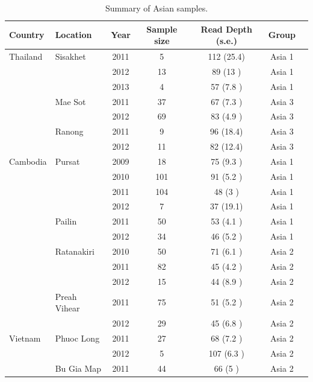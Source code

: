 \documentclass[9pt,lineno]{elife}
\begin{document}
\begin{table}[bt]
\caption{Summary of Asian samples.} \label{tab:Pf3kAsia}
\begin{tabular}{l l c c c c c}
\toprule
Country & Location & Year & Sample size & Read Depth (s.e.) & Group \\
\midrule
Thailand        &Sisakhet       &2011 &5    &112  (25.4)&Asia 1  \\
                &               &2012 &13   &89   (13  )&Asia 1  \\
                &               &2013 &4    &57   (7.8 )&Asia 1  \\
                &Mae Sot        &2011 &37   &67   (7.3 )&Asia 3  \\
                &               &2012 &69   &83   (4.9 )&Asia 3  \\
                &Ranong         &2011 &9    &96   (18.4)&Asia 3  \\
                &               &2012 &11   &82   (12.4)&Asia 3  \\
 \hline
Cambodia        &Pursat         &2009 &18   &75   (9.3 )&Asia 1  \\
                &               &2010 &101  &91   (5.2 )&Asia 1  \\
                &               &2011 &104  &48   (3   )&Asia 1  \\
                &               &2012 &7    &37   (19.1)&Asia 1  \\
                &Pailin         &2011 &50   &53   (4.1 )&Asia 1  \\
                &               &2012 &34   &46   (5.2 )&Asia 1  \\
                &Ratanakiri     &2010 &50   &71   (6.1 )&Asia 2  \\
                &               &2011 &82   &45   (4.2 )&Asia 2  \\
                &               &2012 &15   &44   (8.9 )&Asia 2  \\
                &Preah Vihear   &2011 &75   &51   (5.2 )&Asia 2  \\
                &               &2012 &29   &45   (6.8 )&Asia 2  \\
 \hline
Vietnam         &Phuoc Long     &2011 &27   &68   (7.2 )&Asia 2  \\
                &               &2012 &5    &107  (6.3 )&Asia 2  \\
                &Bu Gia Map     &2011 &44   &66   (5   )&Asia 2  \\

\end{tabular}
\end{table}
\end{document}
